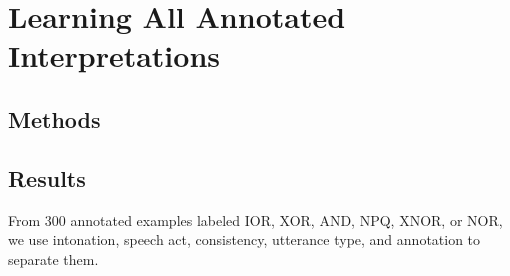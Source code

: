 \documentclass[oneside]{report}
\theoremstyle{definition}
\theoremstyle{definition}
\theoremstyle{definition}
\theoremstyle{remark}
\begin{document}
\section{Learning All Annotated
Interpretations}\label{learning-all-annotated-interpretations}

\subsection{Methods}\label{methods-6}

\subsection{Results}\label{results-6}

From 300 annotated examples labeled IOR, XOR, AND, NPQ, XNOR, or NOR, we
use intonation, speech act, consistency, utterance type, and annotation
to separate them. \newline
\end{document}
